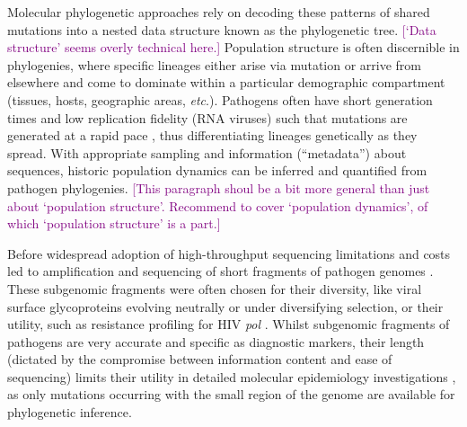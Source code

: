 \documentclass[11pt,oneside,letterpaper]{article}
\def\tbc#1{\textcolor{purple}{[#1]}}
\begin{document}
Molecular phylogenetic approaches rely on decoding these patterns of shared mutations into a nested data structure known as the phylogenetic tree.
\tbc{`Data structure' seems overly technical here.}
Population structure is often discernible in phylogenies, where specific lineages either arise via mutation or arrive from elsewhere and come to dominate within a particular demographic compartment (tissues, hosts, geographic areas, \textit{etc}.).
Pathogens often have short generation times and low replication fidelity (RNA viruses) such that mutations are generated at a rapid pace \citep{drummond_measurably_2003,biek_measurably_2015}, thus differentiating lineages genetically as they spread.
With appropriate sampling and information (``metadata'') about sequences, historic population dynamics can be inferred and quantified from pathogen phylogenies.
\tbc{This paragraph shoul be a bit more general than just about `population structure'. Recommend to cover `population dynamics', of which `population structure' is a part.}

Before widespread adoption of high-throughput sequencing limitations and costs led to amplification and sequencing of short fragments of pathogen genomes \citep{jin_genetic_1999,jin_proposal_2005}.
These subgenomic fragments were often chosen for their diversity, like viral surface glycoproteins evolving neutrally or under diversifying selection, or their utility, such as resistance profiling for HIV \textit{pol} \citep{kaye_phylogenetic_2008,rhee_human_2003}.
Whilst subgenomic fragments of pathogens are very accurate and specific as diagnostic markers, their length (dictated by the compromise between information content and ease of sequencing) limits their utility in detailed molecular epidemiology investigations \citep{wohl_co-circulating_2018}, as only mutations occurring with the small region of the genome are available for phylogenetic inference.
\end{document}
